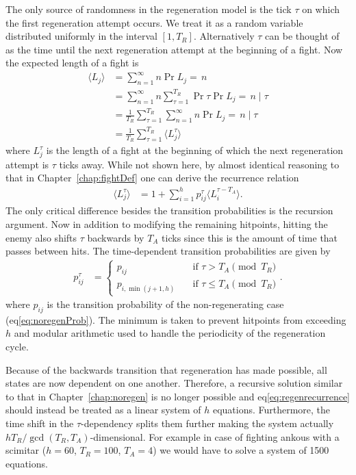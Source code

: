 The only source of randomness in the regeneration model is the tick $\tau$ on which the first regeneration attempt occurs. We treat it as a random variable distributed uniformly in the interval $[1, T_R]$. Alternatively $\tau$ can be thought of as the time until the next regeneration attempt at the beginning of a fight. Now the expected length of a fight is
\begin{align}
	\langle L_j \rangle
		&= \sum_{n=1}^{\infty}n\Pr{L_j=\,n}\nonumber\\
		&= \sum_{n=1}^{\infty}n\sum_{\tau=1}^{T_R}\Pr{\tau}\Pr{L_j=\,n \mid \tau}\nonumber\\
		&= \frac{1}{T_R}\sum_{\tau=1}^{T_R}\sum_{n=1}^{\infty}n\Pr{L_j=\,n \mid \tau}\nonumber\\
		&= \frac{1}{T_R}\sum_{\tau=1}^{T_R} \langle L_j^\tau \rangle
\end{align}
where $L_j^\tau$ is the length of a fight at the beginning of which the next regeneration attempt is $\tau$ ticks away. While not shown here, by almost identical reasoning to that in Chapter~\ref{chap:fightDef} one can derive the recurrence relation
\begin{align}\label{eq:regenrecurrence}
	\langle L_j^\tau \rangle
		&= 1 + \sum_{i=1}^{h} p_{ij}^\tau \langle L_i^{\tau - T_A} \rangle.
\end{align}
The only critical difference besides the transition probabilities is the recursion argument. Now in addition to modifying the remaining hitpoints, hitting the enemy also shifts $\tau$ backwards by $T_A$ ticks since this is the amount of time that passes between hits. The time-dependent transition probabilities are given by
\begin{align}
    p_{ij}^\tau
        &= \begin{cases}
			p_{ij} \quad &\mbox{if } \tau > T_A \pmod {T_R} \\
			p_{i,\min(j+1,h)} \quad &\mbox{if } \tau \leq T_A \pmod {T_R}
		\end{cases}\label{eq:damageDistribution}.
\end{align}
where $p_{ij}$ is the transition probability of the non-regenerating case (eq\ref{eq:noregenProb}). The minimum is taken to prevent hitpoints from exceeding $h$ and modular arithmetic used to handle the periodicity of the regeneration cycle.

Because of the backwards transition that regeneration has made possible, all states are now dependent on one another. Therefore, a recursive solution similar to that in Chapter~\ref{chap:noregen} is no longer possible and eq\ref{eq:regenrecurrence} should instead be treated as a linear system of $h$ equations. Furthermore, the time shift in the $\tau$-dependency splits them further making the system actually $hT_R/\gcd(T_R, T_A)$-dimensional.
For example in case of fighting ankous with a scimitar ($h=60$, $T_R=100$, $T_A=4$) we would have to solve a system of 1500 equations.
\pagebreak
